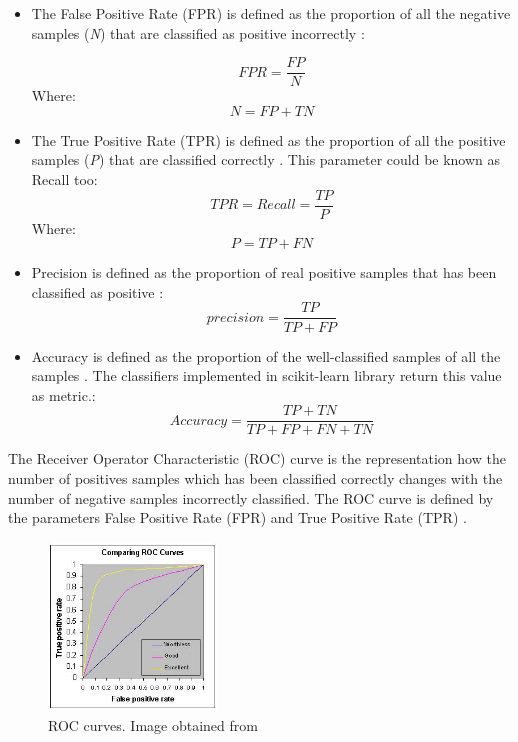 \begin{itemize}
\item The False Positive Rate (FPR) is defined as the proportion of all the negative samples (\textit{N}) that are classified as positive incorrectly \cite{ROC}:

\begin{equation}
FPR = \frac{FP}{N}
\end{equation}
Where:
 \begin{equation}
  N = FP + TN
\end{equation}

\item The True Positive Rate (TPR) is defined as the proportion of all the positive samples (\textit{P}) that are classified correctly \cite{ROC}. This parameter could be known as Recall too:
\begin{equation}
TPR = Recall = \frac{TP}{P}
\end{equation}
Where:
 \begin{equation}
  P = TP + FN
\end{equation}

\item Precision is defined as the proportion of real positive samples that has been classified as positive \cite{ROC,Sokolova}:
\begin{equation}
  precision = \frac{TP}{TP + FP}
\end{equation}

\item Accuracy is defined as the proportion of the well-classified samples of all the samples \cite{Sokolova}. The classifiers implemented in scikit-learn library return this value as metric.:
\begin{equation}
  Accuracy = \frac{TP + TN}{TP + FP + FN + TN}
\end{equation}
\end{itemize}

The Receiver Operator Characteristic (ROC) curve is the representation how the number of positives samples which has been classified correctly changes with the number of negative samples incorrectly classified. The ROC curve is defined by the parameters False Positive Rate (FPR) and True Positive Rate (TPR) \cite{ROC}.\\

\begin{figure}[htb]
  \centering
  \includegraphics[width=0.4\textwidth]{images_miscelaneus/roccomp.jpg}
  \caption{ROC curves. Image obtained from \cite{RocImage}}
  \label{RocImage}
\end{figure}

